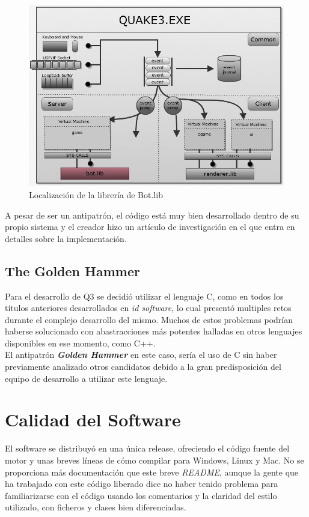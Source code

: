 \documentclass[a4paper,12pt]{report}
\begin{document}
	\begin{center}
	\begin{figure}[h]
		\includegraphics[width=1\textwidth]{images/bot}
        \caption{Localización de la librería de Bot.lib}
		\label{fig:bot}
	\end{figure}
\end{center}

A pesar de ser un antipatrón, el código está muy bien desarrollado dentro de su propio sistema y el creador hizo un artículo de investigación en el que entra en detalles sobre la implementación.\cite{quake3}\\

\subsection{The Golden Hammer}

Para el desarrollo de Q3 se decidió utilizar el lenguaje C, como en todos los títulos anteriores desarrollados en \textit{id software}, lo cual presentó multiples retos durante el complejo desarrollo del mismo. Muchos de estos problemas podrían haberse solucionado con abastracciones más potentes halladas en otros lenguajes disponibles en ese momento, como C++.\\

El antipatrón \textit{\textbf{Golden Hammer}} en este caso, sería el uso de C sin haber previamente analizado otros candidatos debido a la gran predisposición del equipo de desarrollo a utilizar este lenguaje.\\

	
	\section{Calidad del Software}
    El software se distribuyó en una única release, ofreciendo el código fuente del motor y unas breves líneas de cómo compilar para Windows, Linux y Mac. No se proporciona más documentación que este breve \textit{README}, aunque la gente que ha trabajado con este código liberado dice no haber tenido problema para familiarizarse con el código usando los comentarios y la claridad del estilo utilizado, con ficheros y clases bien diferenciadas.\\
    
\end{document}
